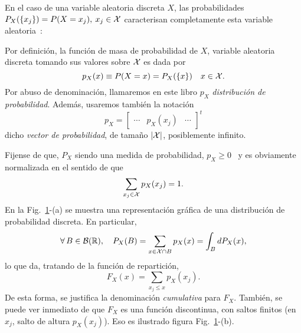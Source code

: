En el  caso de una variable  aleatoria discreta $X$,  las probabilidades $P_X(\{
x_j \})  = P(X = x_j), \:  x_j \in \mathcal{X}$ caracterisan  completamente esta variable
aleatoria~\cite{AthLah06, HogMck13}:
%
\begin{definicion}
  Por  definici\'on, la  funci\'on  de  masa de  probabilidad  de $X$,  variable
  aleatoria discreta tomando sus valores sobre $\mathcal{X}$ es dada por
  \[
  p_X(x) \equiv P(X = x) = P_X( \{ x\} ) \quad x \in \mathcal{X}.
  \]
  Por   abuso  de   denominaci\'on,  llamaremos   en  este   libro   $p_X$  {\it
    distribuci\'on de probabilidad}. Adem\'as, usaremos tambi\'en la notaci\'on
  \[
  p_X = \begin{bmatrix} \cdots & p_X(x_j) & \cdots \end{bmatrix}^t
  \]
  dicho {\it vector de probabilidad}, de tama\~no $|\mathcal{X}|$, posiblemente infinito.
\end{definicion}
%
Fijense de  que, $P_X$ siendo  una medida  de probabilidad, $p_X  \ge 0$ \  y es
obviamente normalizada en el sentido de que
%
\[
\sum_{x_j \in \mathcal{X}} p_X(x_j) = 1.
\]
%
En  la  Fig.~\ref{Fig:MP:ProbaDiscreta}-(a)   se  muestra  una  representaci\'on
gr\'afica de una distribuci\'on de probabilidad discreta.
%
En particular,
%
\[
\forall \,  B \in  \mathcal{B}(\mathbb{R}), \quad  P_X(B) = \sum_{x  \in \mathcal{X}  \cap B}  p_X(x) =
\int_B dP_X(x),
\]
%
lo que da, tratando de la funci\'on de repartici\'on,
%
\[
F_X(x) = \sum_{x_j \le x} p_X(x_j).
\]
%
De  esta forma,  se justifica  la  denominaci\'on {\it  cumulativa} para  $F_X$.
Tambi\'en, se puede ver inmediato de que $F_X$ es una funci\'on discontinua, con
saltos finitos (en  $x_j$, salto de altura $p_X(x_j)$).  Eso es ilustrado figura
Fig.~\ref{Fig:MP:ProbaDiscreta}-(b).

\begin{figure}[h!]
\begin{center}  \end{center}
%
\label{Fig:MP:ProbaDiscreta}
\end{figure}

